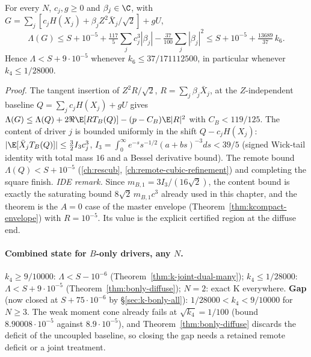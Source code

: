 \begin{theorem}\label{thm:bonly-diffuse}
For every $N$, $c_j,g\ge0$ and $\beta_j\in\C$, with $G=\sum_j[c_jH(X_j)+\beta_jZ^2\bar X_j/\sqrt2]+gU$,
\[
\Lambda(G)\le S+10^{-5}+\tfrac{117}5\sum_jc_j^3|\beta_j|-\tfrac{37}{100}\sum_j|\beta_j|^2\le S+10^{-5}+\tfrac{13689}{37}\,k_6 .
\]
Hence $\Lambda<S+9\cdot10^{-5}$ whenever $k_6\le37/171112500$, in particular whenever $k_4\le1/28000$.
\end{theorem}
\emph{Proof.} The tangent insertion of $Z^2R/\sqrt2$, $R=\sum_j\beta_j\bar X_j$, at the $Z$-independent baseline $Q=\sum_jc_jH(X_j)+gU$ gives
$\Lambda(G)\le\Lambda(Q)+2\Re\E[RT_B(Q)]-(p-C_B)\E|R|^2$ with $C_B<119/125$. The content of driver $j$ is bounded uniformly in the shift
$Q-c_jH(X_j)$: $|\E[\bar X_jT_B(Q)]|\le\frac32I_3c_j^3$, $I_3=\int_0^\infty e^{-s}s^{-1/2}(a+bs)^{-3}ds<39/5$ (signed Wick-tail identity with total mass $16$ and
a Bessel derivative bound). The remote bound $\Lambda(Q)<S+10^{-5}$ (\autoref{ch:rescub}, \autoref{ch:remote-cubic-refinement}) and completing the square finish.
\emph{IDE remark.} Since $m_{B,1}=3I_3/(16\sqrt2)$, the content bound is exactly the saturating bound $8\sqrt2\,m_{B,1}c^3$ already used in this chapter, and the theorem
is the $A=0$ case of the master envelope (Theorem~\ref{thm:kcompact-envelope}) with $R=10^{-5}$. Its value is the explicit certified region at the diffuse end.

\paragraph{Combined state for $B$-only drivers, any $N$.} $k_4\ge9/10000$: $\Lambda<S-10^{-6}$ (Theorem~\ref{thm:k-joint-dual-many}); $k_4\le1/28000$:
$\Lambda<S+9\cdot10^{-5}$ (Theorem~\ref{thm:bonly-diffuse}); $N=2$: exact K everywhere. \textbf{Gap} (now closed at $S+75\cdot10^{-6}$ by \S\ref{sec:k-bonly-all}): $1/28000<k_4<9/10000$ for $N\ge3$. The weak moment cone
already fails at $\sqrt{k_4}=1/100$ (bound $8.90008\cdot10^{-5}$ against $8.9\cdot10^{-5}$), and Theorem~\ref{thm:bonly-diffuse} discards the deficit of the
uncoupled baseline, so closing the gap needs a retained remote deficit or a joint treatment.

